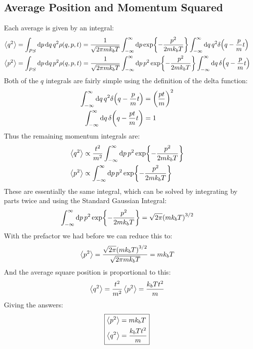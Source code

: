 \documentclass[12pt]{article}
\begin{document}
\subsection{Average Position and Momentum Squared}
Each average is given by an integral:
\begin{align*}
  \ev{q^2}&=\int_{PS}\dd{p}\dd{q}q^2\rho(q,p,t)=\frac1{\sqrt{2\pi mk_bT}}
  \int_{-\infty}^\infty\dd{p}\exp{-\frac{p^2}{2mk_bT}}
  \int_{-\infty}^\infty\dd{q}q^2\delta\qty(q-\frac{p}{m}t)\\
  \ev{p^2}&=\int_{PS}\dd{p}\dd{q}p^2\rho(q,p,t)=\frac1{\sqrt{2\pi mk_bT}}
  \int_{-\infty}^\infty\dd{p}p^2\exp{-\frac{p^2}{2mk_bT}}
  \int_{-\infty}^\infty\dd{q}\delta\qty(q-\frac{p}{m}t)
\end{align*}
Both of the $q$ integrals are fairly simple using the definition of the delta function:
\begin{align*}
  \int_{-\infty}^\infty\dd{q}q^2\delta\qty(q-\frac{p}{m}t)&=
  \qty(\frac{pt}{m})^2\\
  \int_{-\infty}^\infty\dd{q}\delta\qty(q-\frac{pt}{m}t)&=
  1
\end{align*}
Thus the remaining momentum integrals are:
\begin{align*}
  \ev{q^2}&\propto\frac{t^2}{m^2}
  \int_{-\infty}^\infty\dd{p}p^2\exp{-\frac{p^2}{2mk_bT}}\\
  \ev{p^2}&\propto
  \int_{-\infty}^\infty\dd{p}p^2\exp{-\frac{p^2}{2mk_bT}}
\end{align*}
These are essentially the same integral, which can be solved by integrating by parts twice and using the Standard Gaussian Integral:
\begin{align*}
  \int_{-\infty}^\infty\dd{p}p^2\exp{-\frac{p^2}{2mk_bT}}
  =\sqrt{2\pi}\qty(mk_bT)^{3/2}
\end{align*}
With the prefactor we had before we can reduce this to:
\begin{align*}
  \ev{p^2}=\frac{\sqrt{2\pi}\qty(mk_bT)^{3/2}}{\sqrt{2\pi mk_bT}}=
  mk_bT
\end{align*}
And the average square position is proportional to this:
\begin{align*}
  \ev{q^2}=\frac{t^2}{m^2}\ev{p^2}=\frac{k_bTt^2}{m}
\end{align*}
Giving the answers:
\begin{equation}
  \boxed{
  \begin{aligned}
    \ev{p^2}&=mk_bT\\
    \ev{q^2}&=\frac{k_bTt^2}{m}
  \end{aligned}}
\end{equation}
\end{document}
